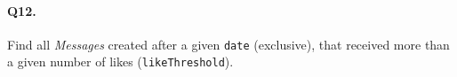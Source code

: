 \paragraph{Q12.}
Find all \emph{Messages} created after a given \texttt{date}
(exclusive), that received more than a given number of likes
(\texttt{likeThreshold}).
